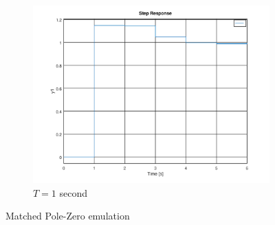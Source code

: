 \documentclass[a4paper, 12pt]{article}
\begin{document}
\begin{figure}[H]
  \begin{subfigure}{.6\textwidth}
    \includegraphics[width=\textwidth]{./img/2_5_mpz1.png}
    \caption{$T = 1$ second}
    \label{fig:mpz1}
  \end{subfigure}
  \caption{Matched Pole-Zero emulation}
\end{figure}
\end{document}
